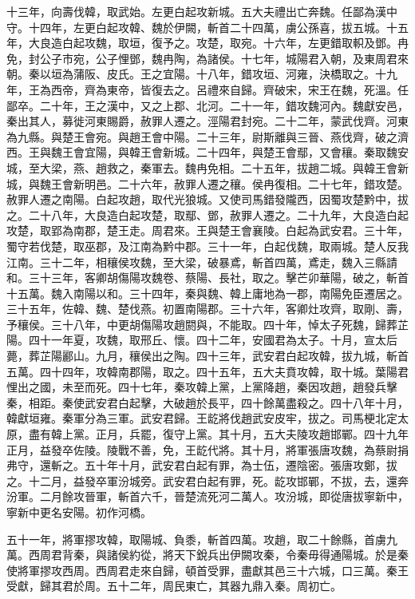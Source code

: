 十三年，向壽伐韓，取武始。左更白起攻新城。五大夫禮出亡奔魏。任鄙為漢中守。十四年，左更白起攻韓、魏於伊闕，斬首二十四萬，虜公孫喜，拔五城。十五年，大良造白起攻魏，取垣，復予之。攻楚，取宛。十六年，左更錯取軹及鄧。冉免，封公子市宛，公子悝鄧，魏冉陶，為諸侯。十七年，城陽君入朝，及東周君來朝。秦以垣為蒲阪、皮氏。王之宜陽。十八年，錯攻垣、河雍，決橋取之。十九年，王為西帝，齊為東帝，皆復去之。呂禮來自歸。齊破宋，宋王在魏，死溫。任鄙卒。二十年，王之漢中，又之上郡、北河。二十一年，錯攻魏河內。魏獻安邑，秦出其人，募徙河東賜爵，赦罪人遷之。涇陽君封宛。二十二年，蒙武伐齊。河東為九縣。與楚王會宛。與趙王會中陽。二十三年，尉斯離與三晉、燕伐齊，破之濟西。王與魏王會宜陽，與韓王會新城。二十四年，與楚王會鄢，又會穰。秦取魏安城，至大梁，燕、趙救之，秦軍去。魏冉免相。二十五年，拔趙二城。與韓王會新城，與魏王會新明邑。二十六年，赦罪人遷之穰。侯冉復相。二十七年，錯攻楚。赦罪人遷之南陽。白起攻趙，取代光狼城。又使司馬錯發隴西，因蜀攻楚黔中，拔之。二十八年，大良造白起攻楚，取鄢、鄧，赦罪人遷之。二十九年，大良造白起攻楚，取郢為南郡，楚王走。周君來。王與楚王會襄陵。白起為武安君。三十年，蜀守若伐楚，取巫郡，及江南為黔中郡。三十一年，白起伐魏，取兩城。楚人反我江南。三十二年，相穰侯攻魏，至大梁，破暴鳶，斬首四萬，鳶走，魏入三縣請和。三十三年，客卿胡傷陽攻魏卷、蔡陽、長社，取之。擊芒卯華陽，破之，斬首十五萬。魏入南陽以和。三十四年，秦與魏、韓上庸地為一郡，南陽免臣遷居之。三十五年，佐韓、魏、楚伐燕。初置南陽郡。三十六年，客卿灶攻齊，取剛、壽，予穰侯。三十八年，中更胡傷陽攻趙閼與，不能取。四十年，悼太子死魏，歸葬芷陽。四十一年夏，攻魏，取邢丘、懷。四十二年，安國君為太子。十月，宣太后薨，葬芷陽酈山。九月，穰侯出之陶。四十三年，武安君白起攻韓，拔九城，斬首五萬。四十四年，攻韓南郡陽，取之。四十五年，五大夫賁攻韓，取十城。葉陽君悝出之國，未至而死。四十七年，秦攻韓上黨，上黨降趙，秦因攻趙，趙發兵擊秦，相距。秦使武安君白起擊，大破趙於長平，四十餘萬盡殺之。四十八年十月，韓獻垣雍。秦軍分為三軍。武安君歸。王龁將伐趙武安皮牢，拔之。司馬梗北定太原，盡有韓上黨。正月，兵罷，復守上黨。其十月，五大夫陵攻趙邯鄲。四十九年正月，益發卒佐陵。陵戰不善，免，王龁代將。其十月，將軍張唐攻魏，為蔡尉捐弗守，還斬之。五十年十月，武安君白起有罪，為士伍，遷陰密。張唐攻鄭，拔之。十二月，益發卒軍汾城旁。武安君白起有罪，死。龁攻邯鄲，不拔，去，還奔汾軍。二月餘攻晉軍，斬首六千，晉楚流死河二萬人。攻汾城，即從唐拔寧新中，寧新中更名安陽。初作河橋。

五十一年，將軍摎攻韓，取陽城、負黍，斬首四萬。攻趙，取二十餘縣，首虜九萬。西周君背秦，與諸侯約從，將天下銳兵出伊闕攻秦，令秦毋得通陽城。於是秦使將軍摎攻西周。西周君走來自歸，頓首受罪，盡獻其邑三十六城，口三萬。秦王受獻，歸其君於周。五十二年，周民東亡，其器九鼎入秦。周初亡。

